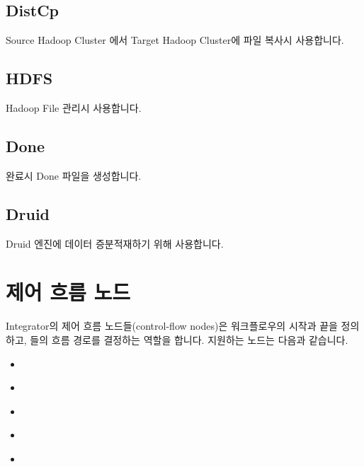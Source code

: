 \documentclass[letterpaper,10pt,english]{sphinxmanual}
\begin{document}
\subsection{DistCp}
\label{\detokenize{integrator/part03/tasks:distcp}}
Source Hadoop Cluster 에서 Target Hadoop Cluster에 파일 복사시 사용합니다.


\subsection{HDFS}
\label{\detokenize{integrator/part03/tasks:hdfs}}
Hadoop File 관리시 사용합니다.


\subsection{Done}
\label{\detokenize{integrator/part03/tasks:done}}
완료시 Done 파일을 생성합니다.


\subsection{Druid}
\label{\detokenize{integrator/part03/tasks:druid}}
Druid 엔진에 데이터 증분적재하기 위해 사용합니다.


\section{제어 흐름 노드}
\label{\detokenize{integrator/part03/control_flow:control-flow-nodes}}\label{\detokenize{integrator/part03/control_flow:id1}}\label{\detokenize{integrator/part03/control_flow::doc}}
Integrator의 제어 흐름 노드들(control-flow nodes)은 워크플로우의 시작과 끝을 정의하고, {\hyperref[\detokenize{integrator/part03/tasks:action-nodes}]{}}들의 흐름 경로를 결정하는 역할을 합니다.
지원하는 노드는 다음과 같습니다.
\begin{itemize}
\item {} 
{\hyperref[\detokenize{integrator/part03/control_flow:start}]{}}

\item {} 
{\hyperref[\detokenize{integrator/part03/control_flow:end}]{}}

\item {} 
{\hyperref[\detokenize{integrator/part03/control_flow:decision}]{}}

\item {} 
{\hyperref[\detokenize{integrator/part03/control_flow:fork}]{}}

\item {} 
{\hyperref[\detokenize{integrator/part03/control_flow:join}]{}}

\end{itemize}
\end{document}

